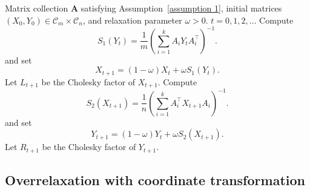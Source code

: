 \documentclass[a4paper]{article}
\newcommand{\bA}{\mathbf{A}}
\newcommand{\caC}{\mathcal{C}}
\theoremstyle{definition}
\numberwithin{equation}{section}
\begin{document}
\begin{algorithm}[t]
\small
\caption{Fixed-Point Iteration on PD cone with Overrelaxation (PD-OR)}\label{algo: overrelaxation PD}
\begin{algorithmic}[1]
\Input
Matrix collection $\bA$ satisfying Assumption~\ref{assumption 1},  initial matrices $(X_0, Y_0) \in \caC_m \times \caC_n$, and relaxation parameter $\omega >0$.
\For
{$t = 0,1,2,\dots$}
    \State
    Compute
    \[
    S_1(Y_t) = \frac{1}{m} \left(\sum_{i=1}^k A_i Y_t A_i^\top \right)^{-1}.  %
    \]
    and set
    \[
    X_{t+1} = (1-\omega) X_t + \omega S_1(Y_t).
    \]
    Let $L_{t+1}$ be the Cholesky factor of $X_{t+1}$.
    \State
    Compute
    \[
    S_2(X_{t+1}) = \frac{1}{n} \left(\sum_{i=1}^k A_i^\top X_{t+1} A_i \right)^{-1}. %
    \]
    and set
    \[
    Y_{t+1} = (1-\omega) Y_t + \omega S_2(X_{t+1}).
    \]
    Let $R_{t+1}$ be the Cholesky factor of $Y_{t+1}$.
\EndFor
\end{algorithmic}
\end{algorithm}

\subsection{Overrelaxation with coordinate transformation}
\end{document}
